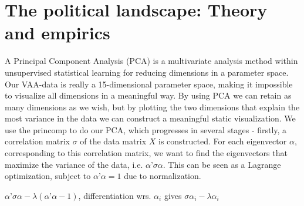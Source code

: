 \section{The political landscape: Theory and empirics}
A Principal Component Analysis (PCA) is a multivariate analysis method within unsupervised statistical learning for reducing dimensions in a parameter space. Our VAA-data is really a 15-dimensional parameter space, making it impossible to visualize all dimensions in a meaningful way. By using PCA we can retain as many dimensions as we wish, but by plotting the two dimensions that explain the most variance in the data we can construct a meaningful static visualization. 
We use the princomp to do our PCA, which progresses in several stages - firstly, a correlation matrix $\sigma$ of the data matrix $X$ is constructed. For each eigenvector $\alpha$, corresponding to this correlation matrix, we want to find the eigenvectors that maximize the variance of the data, i.e. $\alpha’\sigma\alpha$. This can be seen as a Lagrange optimization, subject to $\alpha’\alpha=1$ due to normalization. 
\begin{center}
$\alpha’\sigma\alpha-\lambda( \alpha’\alpha-1)$, differentiation wrs. $\alpha_i$ gives $\sigma\alpha_i-\lambda\alpha_i$
\end{center}

